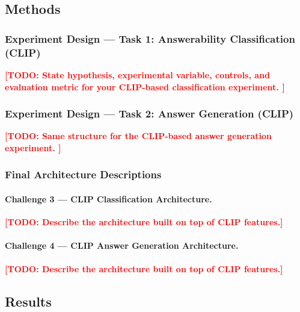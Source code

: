 \documentclass[11pt]{article}
\newcommand{\todo}[1]{\textcolor{red}{\textbf{[TODO: #1]}}}
\begin{document}
\subsection{Methods}

\subsubsection{Experiment Design — Task 1: Answerability Classification (CLIP)}

\todo{
  State hypothesis, experimental variable, controls, and evaluation
  metric for your CLIP-based classification experiment.
}

\subsubsection{Experiment Design — Task 2: Answer Generation (CLIP)}

\todo{
  Same structure for the CLIP-based answer generation experiment.
}

\subsubsection{Final Architecture Descriptions}

\paragraph{Challenge 3 — CLIP Classification Architecture.}
\todo{Describe the architecture built on top of CLIP features.}

\paragraph{Challenge 4 — CLIP Answer Generation Architecture.}
\todo{Describe the architecture built on top of CLIP features.}

\subsection{Results}
\end{document}

